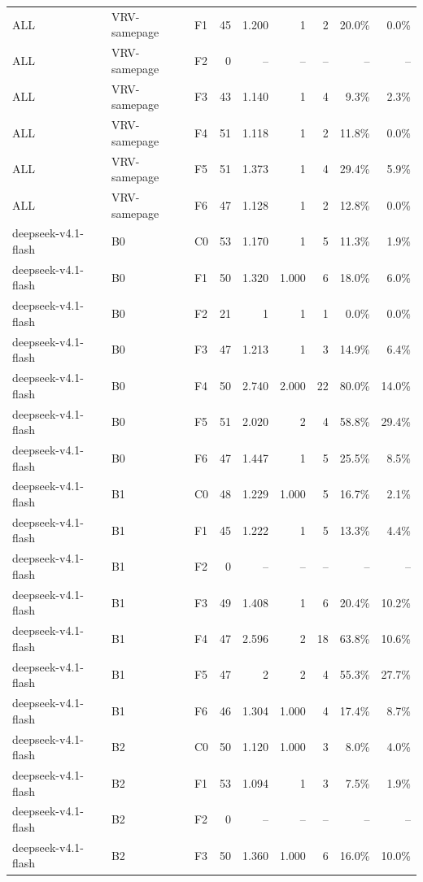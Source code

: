 \begin{tabular}{lllrrrrrr}
ALL & VRV-samepage & F1 & 45 & 1.200 & 1 & 2 & 20.0\% & 0.0\% \\
ALL & VRV-samepage & F2 & 0 & -- & -- & -- & -- & -- \\
ALL & VRV-samepage & F3 & 43 & 1.140 & 1 & 4 & 9.3\% & 2.3\% \\
ALL & VRV-samepage & F4 & 51 & 1.118 & 1 & 2 & 11.8\% & 0.0\% \\
ALL & VRV-samepage & F5 & 51 & 1.373 & 1 & 4 & 29.4\% & 5.9\% \\
ALL & VRV-samepage & F6 & 47 & 1.128 & 1 & 2 & 12.8\% & 0.0\% \\
deepseek-v4.1-flash & B0 & C0 & 53 & 1.170 & 1 & 5 & 11.3\% & 1.9\% \\
deepseek-v4.1-flash & B0 & F1 & 50 & 1.320 & 1.000 & 6 & 18.0\% & 6.0\% \\
deepseek-v4.1-flash & B0 & F2 & 21 & 1 & 1 & 1 & 0.0\% & 0.0\% \\
deepseek-v4.1-flash & B0 & F3 & 47 & 1.213 & 1 & 3 & 14.9\% & 6.4\% \\
deepseek-v4.1-flash & B0 & F4 & 50 & 2.740 & 2.000 & 22 & 80.0\% & 14.0\% \\
deepseek-v4.1-flash & B0 & F5 & 51 & 2.020 & 2 & 4 & 58.8\% & 29.4\% \\
deepseek-v4.1-flash & B0 & F6 & 47 & 1.447 & 1 & 5 & 25.5\% & 8.5\% \\
deepseek-v4.1-flash & B1 & C0 & 48 & 1.229 & 1.000 & 5 & 16.7\% & 2.1\% \\
deepseek-v4.1-flash & B1 & F1 & 45 & 1.222 & 1 & 5 & 13.3\% & 4.4\% \\
deepseek-v4.1-flash & B1 & F2 & 0 & -- & -- & -- & -- & -- \\
deepseek-v4.1-flash & B1 & F3 & 49 & 1.408 & 1 & 6 & 20.4\% & 10.2\% \\
deepseek-v4.1-flash & B1 & F4 & 47 & 2.596 & 2 & 18 & 63.8\% & 10.6\% \\
deepseek-v4.1-flash & B1 & F5 & 47 & 2 & 2 & 4 & 55.3\% & 27.7\% \\
deepseek-v4.1-flash & B1 & F6 & 46 & 1.304 & 1.000 & 4 & 17.4\% & 8.7\% \\
deepseek-v4.1-flash & B2 & C0 & 50 & 1.120 & 1.000 & 3 & 8.0\% & 4.0\% \\
deepseek-v4.1-flash & B2 & F1 & 53 & 1.094 & 1 & 3 & 7.5\% & 1.9\% \\
deepseek-v4.1-flash & B2 & F2 & 0 & -- & -- & -- & -- & -- \\
deepseek-v4.1-flash & B2 & F3 & 50 & 1.360 & 1.000 & 6 & 16.0\% & 10.0\% \\

\end{tabular}
